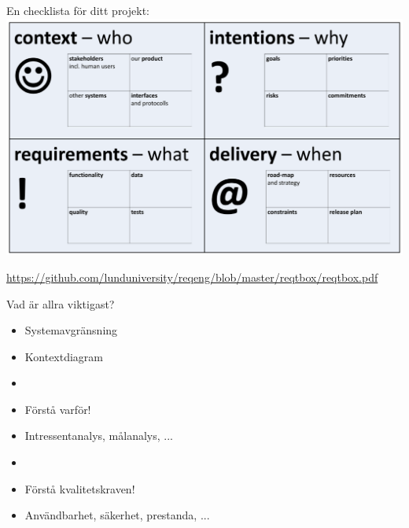 \documentclass{simpleslides}
\begin{document}
\begin{Slide}{En checklista för ditt projekt:}
\hspace*{-0.55cm}\includegraphics[width=1.1\textwidth]{img/reqt-box}

{\noindent\tiny\href{https://github.com/lunduniversity/reqeng/blob/master/reqtbox/reqtbox.pdf}{https://github.com/lunduniversity/reqeng/blob/master/reqtbox/reqtbox.pdf}}
\end{Slide}

\begin{Slide}{Vad är allra viktigast?}
  \begin{itemize}
    \item Systemavgränsning
    \item [] Kontextdiagram
    \item []
    \item Förstå varför! 
    \item[] Intressentanalys, målanalys, ...
    \item[] 
    \item Förstå kvalitetskraven!
    \item[] Användbarhet, säkerhet, prestanda, ...
  \end{itemize}
\end{Slide}


\end{document}
